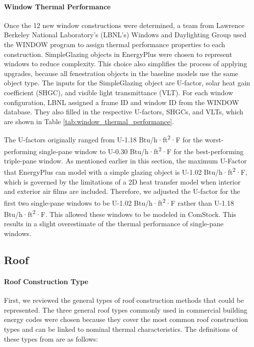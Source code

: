 \paragraph{Window Thermal Performance}
Once the 12 new window constructions were determined, a team from Lawrence Berkeley National Laboratory's (LBNL’s) Windows and Daylighting Group used the WINDOW program to assign thermal performance properties to each construction. SimpleGlazing objects in EnergyPlus were chosen to represent windows to reduce complexity. This choice also simplifies the process of applying upgrades, because all fenestration objects in the baseline models use the same object type. The inputs for the SimpleGlazing object are U-factor, solar heat gain coefficient (SHGC), and visible light transmittance (VLT). For each window configuration, LBNL assigned a frame ID and window ID from the WINDOW database. They also filled in the respective U-factors, SHGCs, and VLTs, which are shown in Table \ref{tab:window_thermal_performance}.

The U-factors originally ranged from U-1.18 Btu/h·ft\textsuperscript{2}·F for the worst-performing single-pane window to U-0.30 Btu/h·ft\textsuperscript{2}·F for the best-performing triple-pane window. As mentioned earlier in this section, the maximum U-Factor that EnergyPlus can model with a simple glazing object is U-1.02 Btu/h·ft\textsuperscript{2}·F, which is governed by the limitations of a 2D heat transfer model when interior and exterior air films are included. Therefore, we adjusted the U-factor for the first two single-pane windows to be U-1.02 Btu/h·ft\textsuperscript{2}·F rather than U-1.18 Btu/h·ft\textsuperscript{2}·F. This allowed these windows to be modeled in ComStock. This results in a slight overestimate of the thermal performance of single-pane windows.


\subsection{Roof} %
\paragraph{Roof Construction Type}
First, we reviewed the general types of roof construction methods that could be represented. The three general roof types commonly used in commercial building energy codes were chosen because they cover the most common roof construction types and can be linked to nominal thermal characteristics. The definitions of these types from \cite{ashrae_901_2010} are as follows:

